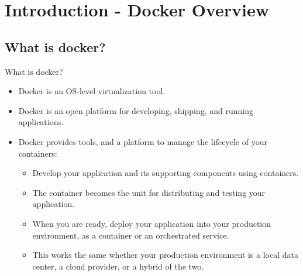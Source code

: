
\section{Introduction - Docker Overview}\label{sec:introduction-docker-overview}

\subsection{What is docker?}\label{subsec:what-is-docker}
\begin{frame}{What is docker?}
    \begin{itemize}[<+- | alert@+>]
        \item Docker is an OS-level virtualization tool.
        \item Docker is an open platform for developing, shipping, and running applications.
        \item Docker provides tools, and a platform to manage the lifecycle of your containers:
        \begin{itemize}
            \item Develop your application and its supporting components using containers.
            \item The container becomes the unit for distributing and testing your application.
            \item When you are ready, deploy your application into your production environment, as a container or an orchestrated service.
            \item This works the same whether your production environment is a local data center, a cloud provider, or a hybrid of the two.
        \end{itemize}
    \end{itemize}
\end{frame}

